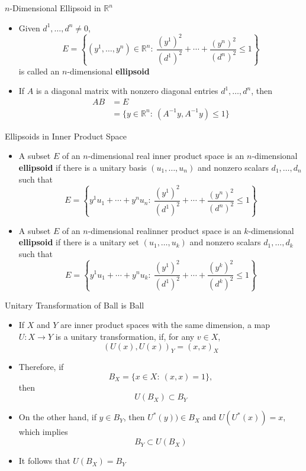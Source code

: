 \documentclass[usenames,dvipsnames,10pt]{beamer}
\newcommand{\R}{\mathbb{R}}
\begin{document}
\begin{frame}
  {$n$-Dimensional Ellipsoid in $\mathbb{R}^n$}

  \begin{itemize}
  \item Given $d^1, \dots, d^n \ne 0$,
    \[
      E = \left\{ (y^1, \dots, y^n) \in \R^n:\
        \frac{(y^1)^2}{(d^1)^2} + \cdots + \frac{(y^n)^2}{(d^n)^2} \le 1 \right\}
    \]
    is called an $n$-dimensional {\bf ellipsoid}
  \item If $A$ is a diagonal matrix with nonzero diagonal entries $d^1, \dots, d^n$, then
    \begin{align*}
      AB &= E\\
         &= \{ y \in \R^n:\ (A^{-1}y,A^{-1}y) \le 1 \}
    \end{align*}
  \end{itemize}
\end{frame}

\begin{frame}
  {Ellipsoids in Inner Product Space}

  \begin{itemize}
  \item A subset $E$ of an $n$-dimensional real inner product space is an $n$-dimensional {\bf ellipsoid} if there is a unitary basis $(u_1, \dots, u_n)$ and nonzero scalars $d_1, \dots, d_n$ such that
    \[ E = \left\{ y^1u_1+\cdots+y^nu_n:\ \frac{(y^1)^2}{(d^1)^2} + \cdots + \frac{(y^n)^2}{(d^n)^2} \le 1 \right\} \]
  \item A subset $E$ of an $n$-dimensional realinner product space is an $k$-dimensional {\bf ellipsoid} if there is a unitary set $(u_1, \dots, u_k)$ and nonzero scalars $d_1, \dots, d_k$ such that
    \[ E = \left\{ y^1u_1+\cdots+y^nu_k:\ \frac{(y^1)^2}{(d^1)^2} + \cdots + \frac{(y^k)^2}{(d^k)^2} \le 1 \right\} \]
  \end{itemize}
  
\end{frame}

\begin{frame}
  {Unitary Transformation of Ball is Ball}

  \begin{itemize}
  \item If $X$ and $Y$ are inner product spaces with the same dimension, a map $U: X \rightarrow Y$ is a unitary transformation, if, for any $v \in X$,
    \[
      (U(x),U(x))_Y = (x,x)_X
    \]
  \item Therefore, if
    \[ B_X = \{ x\in X:\ (x,x) = 1 \}, \]
    then
    \[ U(B_X) \subset B_Y \]
  \item On the other hand, if $y \in B_Y$, then $U^*(y)) \in B_X$ and $U(U^*(x)) = x$, which implies
    \[ B_Y \subset U(B_X) \]
  \item It follows that $U(B_X) = B_Y$
  \end{itemize}
\end{frame}
\end{document}
